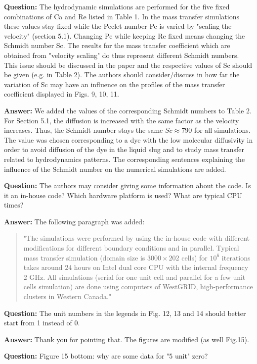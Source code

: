 \documentclass{article}
\begin{document}
\textbf{Question:} The hydrodynamic simulations are performed for the five fixed combinations of Ca and Re listed in Table 1. In the mass transfer simulations these values stay fixed while the Peclet number Pe is varied by "scaling the velocity" (section 5.1). Changing Pe while keeping Re fixed means changing the Schmidt number Sc. The results for the mass transfer coefficient which are obtained from "velocity scaling" do thus represent different Schmidt numbers. This issue should be discussed in the paper and the respective values of Sc should be given (e.g. in Table 2). The authors should consider/discuss in how far the variation of Sc may have an influence on the profiles of the mass transfer coefficient displayed in Figs. 9, 10, 11.

\textbf{Answer:} We added the values of the corresponding Schmidt numbers to Table 2. For Section 5.1, the diffusion is increased with the same factor as  the velocity increases. Thus, the Schmidt number stays the same  $Sc\approx790$ for all simulations. The value was chosen corresponding to a dye with the low molecular diffusivity in order to avoid diffusion of the dye in the liquid slug and to study mass transfer related to hydrodynamics patterns. The corresponding sentences explaining the influence of the Schmidt number on the numerical simulations are added.

\textbf{Question:} The authors may consider giving some information about the code. Is it an in-house code? Which hardware platform is used? What are typical CPU times?

\textbf{Answer:} The following paragraph was added:
\begin{quote}
"The simulations were performed by using the in-house code with different modifications for different boundary conditions and in parallel. Typical mass transfer simulation (domain size is $3000\times202$ cells) for $10^{6}$ iterations takes around $24$ hours on Intel dual core CPU with the internal frequency $2$ GHz. All simulations (serial for one unit cell and parallel for a few unit cells simulation) are done using computers of WestGRID, high-performance clusters in Western Canada."
\end{quote}

\textbf{Question:} The unit numbers in the legends in Fig. 12, 13 and 14 should better start from 1 instead of 0.

\textbf{Answer:} Thank you for pointing that. The figures are modified (as well Fig.15).

\textbf{Question:} Figure 15 bottom: why are some data for "5 unit" zero?
\end{document}

